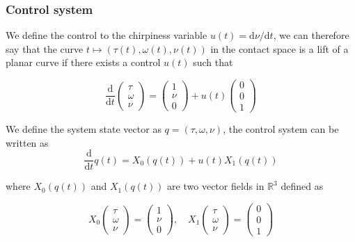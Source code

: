 \documentclass[american,]{article}
\theoremstyle{definition}
\theoremstyle{definition}
\theoremstyle{definition}
\theoremstyle{remark}
\begin{document}
\hypertarget{control-system}{%
\subsubsection{Control system}\label{control-system}}

We define the control to the chirpiness variable \(u(t)=\mathrm{d}\nu/\mathrm{d}t\),
we can therefore say that the curve \(t\mapsto(\tau(t),\omega(t),\nu(t))\)
in the contact space is a lift of a planar curve if there exists
a control \(u(t)\) such that

\begin{equation}
\frac{\mathrm{d}}{\mathrm{d}t}\begin{pmatrix}\tau\\\omega\\\nu\end{pmatrix} = \begin{pmatrix}1\\\nu\\0\end{pmatrix} + u(t)\begin{pmatrix}0\\0\\1\end{pmatrix}
\end{equation}

We define the system state vector as \(q=(\tau,\omega,\nu)\), the control system
can be written as
\begin{equation}
\frac{\mathrm{d}}{\mathrm{d}t}q(t) = X_0(q(t)) + u(t) X_1(q(t))
\end{equation}

where \(X_0(q(t))\) and \(X_1(q(t))\) are two vector fields in \(\mathbb{R}^3\) defined as

\begin{equation}
X_0\begin{pmatrix}\tau\\\omega\\\nu\end{pmatrix} = \begin{pmatrix}1\\\nu\\0\end{pmatrix},\quad 
X_1\begin{pmatrix}\tau\\\omega\\\nu\end{pmatrix} = \begin{pmatrix}0\\0\\1\end{pmatrix}
\end{equation}
\end{document}
